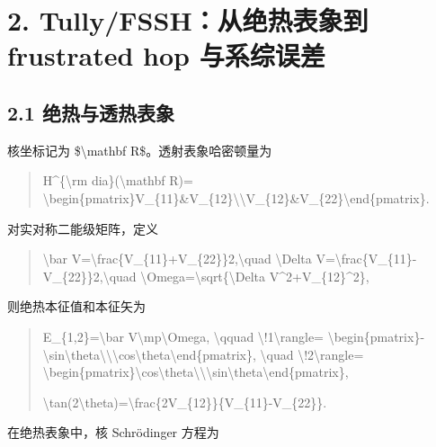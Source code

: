 \documentclass[UTF8,openany,11pt,fontset=fandol]{ctexbook}
\begin{document}
\section{\texorpdfstring{\textbf{2. Tully/FSSH：从绝热表象到
frustrated hop
与系综误差}}{2. Tully/FSSH：从绝热表象到 frustrated hop 与系综误差}}\label{tullyfsshux4eceux7eddux70edux8868ux8c61ux5230-frustrated-hop-ux4e0eux7cfbux7efcux8befux5dee}

\subsection{\texorpdfstring{\textbf{2.1
绝热与透热表象}}{2.1 绝热与透热表象}}\label{ux7eddux70edux4e0eux900fux70edux8868ux8c61}

核坐标记为 \$\textbackslash mathbf R\$。透射表象哈密顿量为

\begin{quote}
H\^{}\{\textbackslash rm dia\}(\textbackslash mathbf R)=
\textbackslash begin\{pmatrix\}V\_\{11\}\&V\_\{12\}\textbackslash\textbackslash V\_\{12\}\&V\_\{22\}\textbackslash end\{pmatrix\}.
\end{quote}

对实对称二能级矩阵，定义

\begin{quote}
\textbackslash bar
V=\textbackslash frac\{V\_\{11\}+V\_\{22\}\}2,\textbackslash quad
\textbackslash Delta
V=\textbackslash frac\{V\_\{11\}-V\_\{22\}\}2,\textbackslash quad
\textbackslash Omega=\textbackslash sqrt\{\textbackslash Delta
V\^{}2+V\_\{12\}\^{}2\},
\end{quote}

则绝热本征值和本征矢为

\begin{quote}
E\_\{1,2\}=\textbackslash bar V\textbackslash mp\textbackslash Omega,
\textbackslash qquad \textbar\textbackslash!1\textbackslash rangle=
\textbackslash begin\{pmatrix\}-\textbackslash sin\textbackslash theta\textbackslash\textbackslash\textbackslash cos\textbackslash theta\textbackslash end\{pmatrix\},
\textbackslash quad \textbar\textbackslash!2\textbackslash rangle=
\textbackslash begin\{pmatrix\}\textbackslash cos\textbackslash theta\textbackslash\textbackslash\textbackslash sin\textbackslash theta\textbackslash end\{pmatrix\},

\textbackslash tan(2\textbackslash theta)=\textbackslash frac\{2V\_\{12\}\}\{V\_\{11\}-V\_\{22\}\}.
\end{quote}

在绝热表象中，核 Schrödinger 方程为
\end{document}
